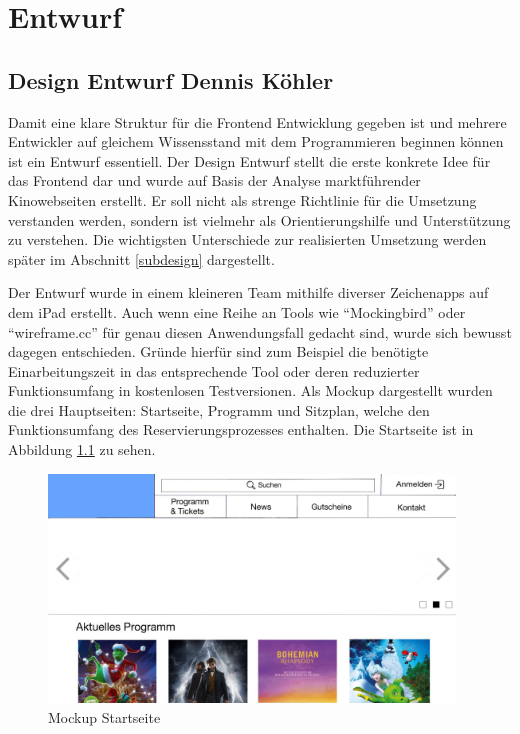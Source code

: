 \chapter{Entwurf}\label{entwurf}
	\section[Design Entwurf]{Design Entwurf {\hfill \normalsize Dennis Köhler}}\label{design}
		
		Damit eine klare Struktur für die Frontend Entwicklung gegeben ist und mehrere Entwickler auf gleichem Wissensstand mit dem Programmieren beginnen können ist ein Entwurf essentiell. Der Design Entwurf stellt die erste konkrete Idee für das Frontend dar und wurde auf Basis der Analyse marktführender Kinowebseiten erstellt. Er soll nicht als strenge Richtlinie für die Umsetzung verstanden werden, sondern ist vielmehr als Orientierungshilfe und Unterstützung zu verstehen. Die wichtigsten Unterschiede zur realisierten Umsetzung werden später im Abschnitt \vref{subdesign} dargestellt. 
		
		Der Entwurf wurde in einem kleineren Team mithilfe diverser Zeichenapps auf dem iPad erstellt. Auch wenn eine Reihe an Tools wie \enquote{Mockingbird} oder \enquote{wireframe.cc} für genau diesen Anwendungsfall gedacht sind, wurde sich bewusst dagegen entschieden. Gründe hierfür sind zum Beispiel die benötigte Einarbeitungszeit in das entsprechende Tool oder deren reduzierter Funktionsumfang in kostenlosen Testversionen. 
		Als Mockup dargestellt wurden die drei Hauptseiten: Startseite, Programm und Sitzplan, welche den Funktionsumfang des Reservierungsprozesses enthalten. Die Startseite ist in Abbildung \ref{fig:mockUpStartseite} zu sehen.
		
		\begin{figure}[H]
			\centering 
			\includegraphics[width=10.8cm]{img/mockUp1.png}
			\captionsetup{format=hang}
			\caption[Mockup Startseite]{\label{fig:mockUpStartseite} Mockup Startseite }
		\end{figure}
		

